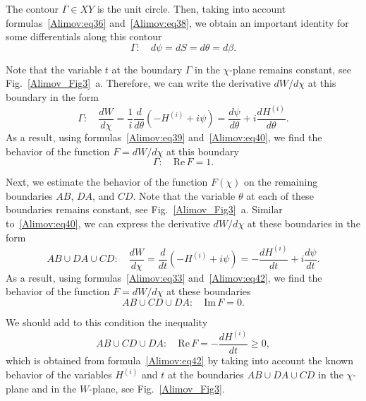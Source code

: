 \documentclass[
11pt,%
tightenlines,%
twoside,%
onecolumn,%
nofloats,%
nobibnotes,%
nofootinbib,%
superscriptaddress,%
noshowpacs,%
centertags]%
{revtex4-2}
\begin{document}
The contour $\Gamma \in XY$ is the unit circle. Then, taking into account
formulas~\eqref{Alimov:eq36} and~\eqref{Alimov:eq38}, we obtain an important identity for some
differentials along this contour
\begin{equation}
\label{Alimov:eq39} \Gamma :\quad d\psi = dS = d\theta = d\beta.
\end{equation}

Note that the variable $t$ at the boundary $\Gamma$ in the $\chi$-plane remains constant, see
Fig.~\ref{Alimov_Fig3}~a. Therefore, we can write the derivative ${dW}/d{\chi}$ at this boundary in
the form~\cite{Alimov:bib19}
\begin{equation}
\label{Alimov:eq40} \Gamma :\quad \frac{dW}{d\chi} = \frac{1}{i}\frac{d}{d\theta}\left( {-H^{(i)}+
i\psi} \right) = \frac{d\psi}{d\theta}+i\frac{dH^{(i)}}{d\theta}.
\end{equation}
As a result, using formulas~\eqref{Alimov:eq39} and~\eqref{Alimov:eq40}, we find the behavior of
the function $F = {dW}/{d\chi}$ at this boundary
\begin{equation}
\label{Alimov:eq41} \Gamma :\quad \mbox{Re}\, F = 1.
\end{equation}

Next, we estimate the behavior of the function $F(\chi )$ on the remaining boundaries $AB$, $DA$, and
$CD$. Note that the variable $\theta$ at each of these boundaries remains constant, see
Fig.~\ref{Alimov_Fig3}~a. Similar to~\eqref{Alimov:eq40}, we can express the derivative
${dW}/{d\chi}$ at these boundaries in the form~\cite{Alimov:bib19}
\begin{equation}
\label{Alimov:eq42} AB \cup DA \cup CD: \quad \frac{dW}{d\chi } = \frac{d}{dt}\left( {-H^{(i)} +
i\psi } \right) = - \frac{dH^{(i)}}{dt} + i\frac{d\psi}{dt}.
\end{equation}
As a result, using formulas~\eqref{Alimov:eq33} and~\eqref{Alimov:eq42}, we find the behavior of
the function $F = {dW}/{d\chi}$ at these boundaries
\begin{equation}
\label{Alimov:eq43} AB \cup CD \cup DA: \quad \mbox{Im} \, F = 0.
\end{equation}

We should add to this condition the inequality
\begin{equation}
\label{Alimov:eq44} AB \cup CD \cup DA: \quad \mbox{Re} \,F = - \frac{dH^{(i)}}{dt} \ge 0,
\end{equation}
which is obtained from formula~\eqref{Alimov:eq42} by taking into account the known
behavior of the variables $H^{(i)}$ and $t$ at the boundaries $AB \cup DA \cup CD$ in the
$\chi$-plane and in the $W$-plane, see Fig.~\ref{Alimov_Fig3}.
\end{document}
